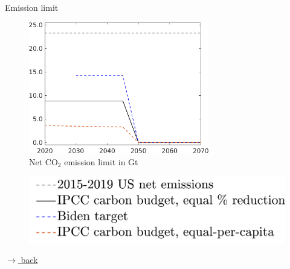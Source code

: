 \documentclass[11pt,aspectratio=169]{beamer}
\begin{document}
\begin{frame}{Emission limit}
	\begin{center}
		\begin{minipage}{0.6\textwidth}
			\begin{figure}
				\caption{Net CO$_2$ emission limit in Gt}
				\includegraphics[width=0.7\textwidth]{../codding_model/own_basedOnFried/optimalPol_010922_revision/figures/all_13Sept22_Tplus30/Emnet_goals_o1_lgd0.png}
			\end{figure}
		\end{minipage}
		\hspace{-10mm}
		\begin{minipage}{0.3\textwidth}
			\begin{figure}
				\includegraphics[width=1.4\textwidth]{../codding_model/own_basedOnFried/optimalPol_010922_revision/figures/all_13Sept22_Tplus30/Emnet_goals_o1_lgd1.png}
			\end{figure}
		\end{minipage}
	\end{center}
	
	\vspace{-5mm}
	\hfill	\hyperlink{resback}{\tiny{$\rightarrow$ back}}
\end{frame}
\end{document}

